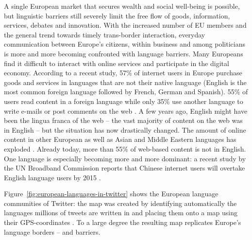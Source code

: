 \documentclass[10pt, plain]{../../metanetpaper}
\begin{document}
\begin{multicols}{2}
A single European market that secures wealth and social well-being is possible, but linguistic barriers still severely limit the free flow of goods, information, services, debates and innovation. With the increased number of EU members and the general trend towards timely trans-border interaction, everyday communication between Europe’s citizens, within business and among politicians is more and more becoming confronted with language barriers. Many Europeans find it difficult to interact with online services and participate in the digital economy. According to a recent study, 57\% of internet users in Europe purchase goods and services in languages that are not their native language (English is the most common foreign language followed by French, German and Spanish). 55\% of users read content in a foreign language while only 35\% use another language to write e-mails or post comments on the web \cite{EC1}. A few years ago, English might have been the lingua franca of the web -- the vast majority of content on the web was in English -- but the situation has now drastically changed. The amount of online content in other European as well as Asian and Middle Eastern languages has exploded \cite{Ford11}. Already today, more than 55\% of web-based content is not in English. One language is especially becoming more and more dominant: a recent study by the UN Broadband Commission reports that Chinese internet users will overtake English language users by 2015 \cite{chinese2012}.

Figure~\ref{fig:european-languages-in-twitter} shows the European language communities of Twitter: the map was created by identifying automatically the languages millions of tweets are written in and placing them onto a map using their GPS-coordinates \cite{fisher11}. To a large degree the resulting map replicates Europe's language borders -- and barriers.

% 


\end{multicols}
\end{document}
